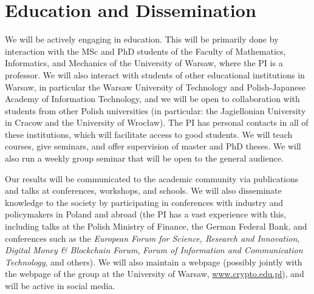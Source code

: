 \documentclass{article}
\begin{document}
\section{Education and Dissemination}

We will be actively engaging in education. This will be primarily done by interaction with the MSc and PhD students of the Faculty of Mathematics, Informatics, and Mechanics of the University of Warsaw, where the PI is a professor. We will also interact with students of other educational institutions in Warsaw, in particular the Warsaw University of Technology and Polish-Japanese Academy of Information Technology, and we will be open to collaboration with students from other Polish universities (in particular: the Jagiellonian University in Cracow and the University of Wrocław). The PI has personal contacts in all of these institutions, which will facilitate access to good students. We will teach courses, give seminars, and offer supervision of master and PhD theses. We will also run a weekly group seminar that will be open to the general audience.

Our results will be communicated to the academic community via publications and talks at conferences, workshops, and schools. We will also disseminate knowledge to the society by participating in conferences with industry and policymakers in Poland and abroad (the PI has a vast experience with this, including talks at the Polish Ministry of Finance, the German Federal Bank, and conferences such as the \emph{European Forum for Science, Research and Innovation}, \emph{Digital Money \& Blockchain Forum}, \emph{Forum of Information and Communication Technology}, and others).
We will also maintain a webpage (possibly jointly with the webpage of the group at the University of Warsaw, \url{www.crypto.edu.pl}), and will be active in social media.




\printbibliography
\end{document}
